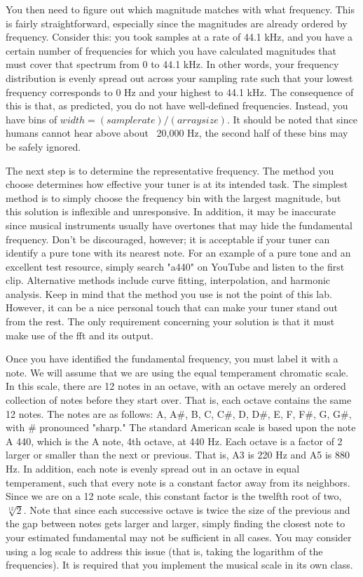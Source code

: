 You then need to figure out which magnitude matches with what frequency.
This is fairly straightforward, especially since the magnitudes are already ordered by frequency.
Consider this: you took samples at a rate of 44.1 kHz, and you have a certain number of frequencies for which you have calculated magnitudes that must cover that spectrum from 0 to 44.1 kHz.
In other words, your frequency distribution is evenly spread out across your sampling rate such that your lowest frequency corresponds to 0 Hz and your highest to 44.1 kHz.
The consequence of this is that, as predicted, you do not have well-defined frequencies.
Instead, you have bins of $width=(sample rate)/(array size)$.
It should be noted that since humans cannot hear above about ~20,000 Hz, the second half of these bins may be safely ignored.

The next step is to determine the representative frequency. 
The method you choose determines how effective your tuner is at its intended task.
The simplest method is to simply choose the frequency bin with the largest magnitude, but this solution is inflexible and unresponsive.
In addition, it may be inaccurate since musical instruments usually have overtones that may hide the fundamental frequency.
Don't be discouraged, however; it is acceptable if your tuner can identify a pure tone with its nearest note.
For an example of a pure tone and an excellent test resource, simply search "a440" on YouTube and listen to the first clip.
Alternative methods include curve fitting, interpolation, and harmonic analysis.
Keep in mind that the method you use is not the point of this lab.
However, it can be a nice personal touch that can make your tuner stand out from the rest.
The only requirement concerning your solution is that it must make use of the \ac{fft} and its output.

Once you have identified the fundamental frequency, you must label it with a note.
We will assume that we are using the equal temperament chromatic scale.
In this scale, there are 12 notes in an octave, with an octave merely an ordered collection of notes before they start over.
That is, each octave contains the same 12 notes.
The notes are as follows: A, A\#, B, C, C\#, D, D\#, E, F, F\#, G, G\#, with \# pronounced "sharp."
The standard American scale is based upon the note A 440, which is the A note, 4th octave, at 440 Hz.
Each octave is a factor of 2 larger or smaller than the next or previous.
That is, A3 is 220 Hz and A5 is 880 Hz.
In addition, each note is evenly spread out in an octave in equal temperament, such that every note is a constant factor away from its neighbors.
Since we are on a 12 note scale, this constant factor is the twelfth root of two, $ \sqrt[12]{2}$.
Note that since each successive octave is twice the size of the previous and the gap between notes gets larger and larger, simply finding the closest note to your estimated fundamental may not be sufficient in all cases.
You may consider using a log scale to address this issue (that is, taking the logarithm of the frequencies).
It is required that you implement the musical scale in its own class.


